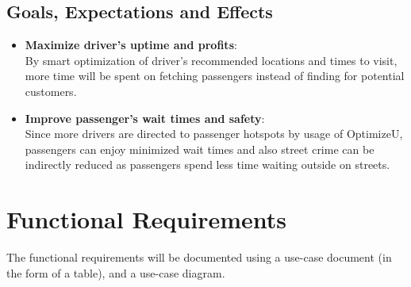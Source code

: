 \documentclass[12pt]{article}
\begin{document}
\subsection{Goals, Expectations and Effects}
\begin{itemize}
	\item \textbf{Maximize driver's uptime and profits}:\\
		By smart optimization of driver's recommended locations and times
		to visit, more time will be spent on fetching passengers instead
		of finding for potential customers.
	\item \textbf{Improve passenger's wait times and safety}:\\
		Since more drivers are directed to passenger hotspots by usage
		of OptimizeU, passengers can enjoy minimized wait times and also
		street crime can be indirectly reduced as passengers spend less time
		waiting outside on streets.
\end{itemize}

\section{Functional Requirements}
The functional requirements will be documented using a use-case document (in
the form of a table), and a use-case diagram.
\end{document}
